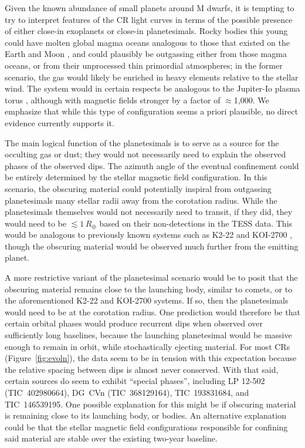 \documentclass[11pt,twocolumn,tighten]{aastex63}
\begin{document}
Given the known abundance of small planets around M dwarfs, it is
tempting to try to interpret features of the CR light curves in terms
of the possible presence of either close-in exoplanets or close-in
planetesimals.  Rocky bodies this young could have molten global magma
oceans analogous to those that existed on the Earth and Moon
\citep[see][]{2022arXiv220310023L}, and could plausibly be outgassing
either from those magma oceans, or from their unprocessed thin
primordial atmospheres; in the former scenario, the gas would likely
be enriched in heavy elements relative to the stellar wind.  The
system would in certain respects be analogous to the Jupiter-Io plasma
torus \citep[e.g.][]{2004jpsm.book..537S}, although with magnetic
fields stronger by a factor of $\approx$1{,}000.  We emphasize that
while this type of configuration seems a priori plausible, no direct
evidence currently supports it.

The main logical function of the planetesimals is to serve as a source
for the occulting gas or dust; they would not necessarily need to
explain the observed phases of the observed dips.  The azimuth angle
of the eventual confinement could be entirely determined by the
stellar magnetic field configuration.  In this scenario, the obscuring
material could potentially inspiral from outgassing planetesimals many
stellar radii away from the corotation radius.  While the
planetesimals themselves would not necessarily need to transit, if
they did, they would need to be $\lesssim 1$\,$R_\oplus$ based on
their non-detections in the TESS data.  This would be analogous to
previously known systems such as K2-22 \citep{2015ApJ...812..112S} and
KOI-2700 \citep{2014ApJ...784...40R}, though the obscuring material
would be observed much further from the emitting planet.  

A more restrictive variant of the planetesimal scenario would be to
posit that the obscuring material remains close to the launching body,
similar to comets, or to the aforementioned K2-22 and KOI-2700
systems.  If so, then the planetesimals would need to be at the
corotation radius.  One prediction would therefore be that certain
orbital phases would produce recurrent dips when observed over
sufficiently long baselines, because the launching planetesimal would
be massive enough to remain in orbit, while stochastically ejecting
material.  For most CRs (Figure~\ref{fig:evoln}), the data seem to be
in tension with this expectation because the relative spacing between
dips is almost never conserved.  With that said, certain sources do
seem to exhibit ``special phases'', including LP 12-502
(TIC~402980664), DG~CVn (TIC~368129164), TIC~193831684, and
TIC~146539195.  One possible explanation for this might be if
obscuring material is remaining close to its launching body, or
bodies.  An alternative explanation could be that the stellar magnetic
field configurations responsible for confining said material are
stable over the existing two-year baseline.
\end{document}
